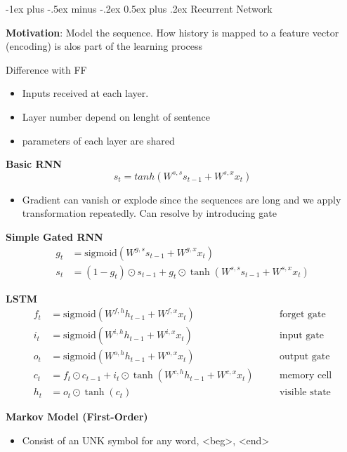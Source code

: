 \documentclass[a4paper, 10pt,landscape]{article}
\makeatletter
\renewcommand{\section}{\@startsection{section}{1}{0mm}%
                                {-1ex plus -.5ex minus -.2ex}%
                                {0.5ex plus .2ex}%
                                {\normalfont\large\bfseries}}
\makeatother
\begin{document}
\begin{multicols*}{3}
\section{Recurrent Network}
\begin{description}
	\item {\bf Motivation}: Model the sequence. How history is mapped to a feature vector (encoding) is alos part of the learning process
	\item {Difference with FF}
		\begin{itemize}
			\item Inputs received at each layer. 
			\item Layer number depend on lenght of sentence
			\item parameters of each layer are shared
		\end{itemize}
	\item {\bf Basic RNN}
		$$s_t  = tanh(W^{s,s}s_{t-1} + W^{s,x}x_t)$$
		\begin{itemize}
			\item Gradient can vanish or explode since the sequences are long and we apply transformation repeatedly. Can resolve by introducing gate
		\end{itemize}
	\item {\bf Simple Gated RNN}
		\begin{align*}
			g_t&=\text{sigmoid}\left(W^{g,s}s_{t-1}+W^{g,x}x_t\right)\\
			s_t&=\left(1-g_t\right)\odot s_{t-1}+g_t\odot\tanh(W^{s,s}s_{t-1}+W^{s,x}x_t)
		\end{align*}
	\item {\bf LSTM}
		\begin{alignat*}{2}
			f_t&=\text{sigmoid}\left(W^{f,h}h_{t-1}+W^{f,x}x_t\right)\quad&&{\text{forget gate}}\\
			i_t&=\text{sigmoid}\left(W^{i,h}h_{t-1}+W^{i,x}x_t\right) &&{\text{input gate}}\\
			o_t&=\text{sigmoid}\left(W^{o,h}h_{t-1}+W^{o,x}x_t\right) &&{\text{output gate}}\\
			c_t&=f_t\odot c_{t-1}+i_t\odot\tanh(W^{c,h}h_{t-1}+W^{c,x}x_t) \quad&&{\text{memory cell}}\\
			h_t&=o_t\odot\tanh(c_t)&&{\text{visible state}}
		\end{alignat*}	
	\item {\bf Markov Model (First-Order)}
		\begin{itemize}
			\item Consist of an UNK symbol for any word, <beg>, <end>

\end{itemize}
\end{description}
\end{multicols*}
\end{document}
